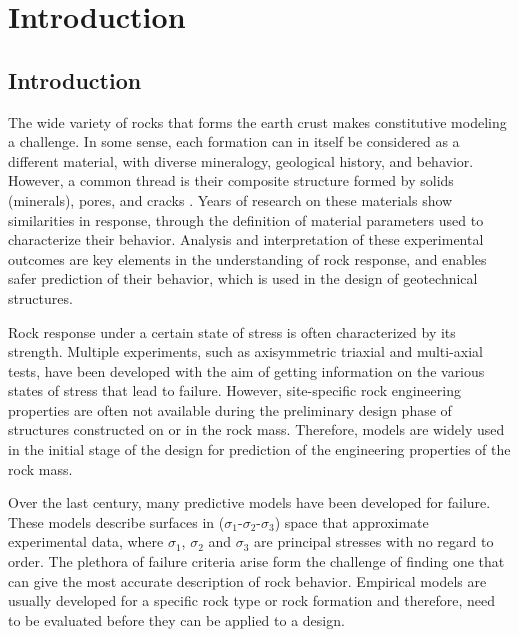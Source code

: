 \chapter{Introduction}
\section{Introduction}

The wide variety of rocks that forms the earth crust makes constitutive modeling a challenge. In some sense, each formation can in itself be considered as a different material, with diverse mineralogy, geological history, and behavior. However, a common thread is their composite structure formed by solids (minerals), pores, and cracks \cite{Labuz2018}. Years of research on these materials show similarities in response, through the definition of material parameters used to characterize their behavior. Analysis and interpretation of these experimental outcomes are key elements in the understanding of rock response, and enables safer prediction of their behavior, which is used in the design of geotechnical structures. 

Rock response under a certain state of stress is often characterized by its strength. Multiple experiments, such as axisymmetric triaxial and multi-axial tests, have been developed with the aim of getting information on the various states of stress that lead to failure. However, site-specific rock engineering properties are often not available during the preliminary design phase of structures constructed on or in the rock mass. Therefore, models are widely used in the initial stage of the design for prediction of the engineering properties of the rock mass. 

Over the last century, many predictive models have been developed for failure. These models describe surfaces in ($\sigma_1$-$\sigma_2$-$\sigma_3$) space that approximate experimental data, where $\sigma_1$, $\sigma_2$ and $\sigma_3$ are principal stresses with no regard to order. The plethora of failure criteria arise form the challenge of finding one that can give the most accurate description of rock behavior. Empirical models are usually developed for a specific rock type or rock formation and therefore, need to be evaluated before they can be applied to a design.

